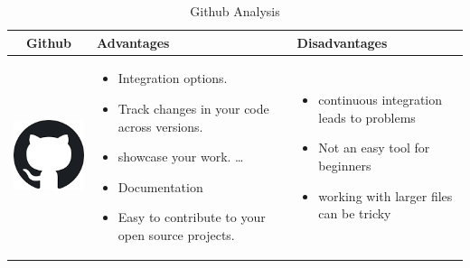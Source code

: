 \documentclass{article}
\begin{document}
			\begin{table}[h!]
				\centering
				\begin{tabular}{|c|m{8cm}|m{5cm}|}
					\hline
					Github & Advantages & Disadvantages \\
					\hline
					\begin{minipage}{0.25\textwidth}
						\includegraphics[width=\linewidth, height=30mm]{github.png}
					\end{minipage}
					& \begin{itemize}
						\item Integration options.
						\item Track changes in your code across versions.
						\item showcase your work. \ldots
						\item Documentation
						\item Easy to contribute to your open source projects.
					\end{itemize}
					& \begin{itemize}
						\item continuous integration leads to problems
						\item Not an easy tool for beginners
						\item working with larger files can be tricky
					\end{itemize} \\
					\hline
				\end{tabular}
				\caption{Github Analysis}
				\label{tbl:mygithub}
			\end{table}
		
\end{document}
